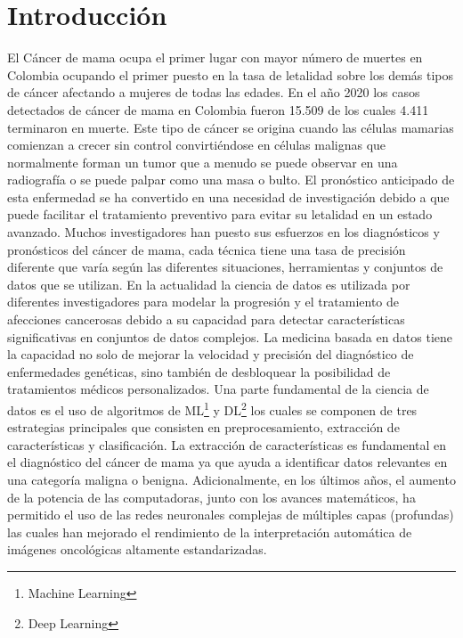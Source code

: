 \section*{Introducción}
El Cáncer de mama ocupa el primer lugar con mayor número de muertes en Colombia ocupando el primer puesto en la tasa de letalidad sobre los demás tipos de cáncer afectando a mujeres de todas las edades. En el año 2020 los casos detectados de cáncer de mama en Colombia fueron 15.509 de los cuales 4.411 terminaron en muerte\cite{InternationalAgencyforResearchonCancer2020}. Este tipo de cáncer se origina cuando las células mamarias comienzan a crecer sin control convirtiéndose en células malignas que normalmente forman un tumor que a menudo se puede observar en una radiografía o se puede palpar como una masa o bulto\cite{Sauer2019}. El pronóstico anticipado de esta enfermedad se ha convertido en una necesidad de investigación debido a que puede facilitar el tratamiento preventivo para evitar su letalidad en un estado avanzado. Muchos investigadores han puesto sus esfuerzos en los diagnósticos y pronósticos del cáncer de mama, cada técnica tiene una tasa de precisión diferente que varía según las diferentes situaciones, herramientas y conjuntos de datos que se utilizan. En la actualidad la ciencia de datos es utilizada por diferentes investigadores para modelar la progresión y el tratamiento de afecciones cancerosas debido a su capacidad para detectar características significativas en conjuntos de datos complejos. La medicina basada en datos tiene la capacidad no solo de mejorar la velocidad y precisión del diagnóstico de enfermedades genéticas, sino también de desbloquear la posibilidad de tratamientos médicos personalizados\cite{Baker2018}. Una parte fundamental de la ciencia de datos es el uso de algoritmos de ML\footnote{Machine Learning} y DL\footnote{Deep Learning} los cuales se componen de tres estrategias principales que consisten en preprocesamiento, extracción de características y clasificación. La extracción de características es fundamental en el diagnóstico del cáncer de mama ya que ayuda a identificar datos relevantes en una categoría maligna o benigna\cite{Fatima2020}. Adicionalmente, en los últimos años, el aumento de la potencia de las computadoras, junto con los avances matemáticos, ha permitido el uso de las redes neuronales complejas de múltiples capas (profundas) las cuales han mejorado el rendimiento de la interpretación automática de imágenes oncológicas altamente estandarizadas\cite{Mann2020}.


